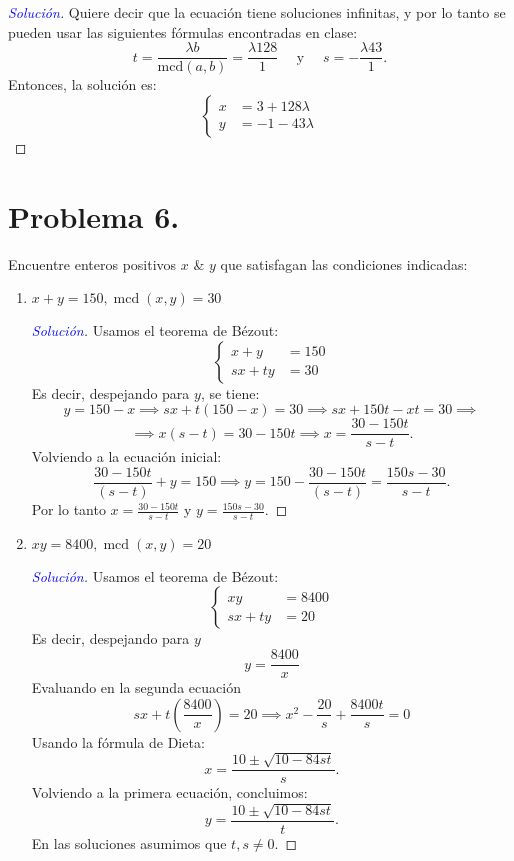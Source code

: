 \documentclass[a4paper,12pt]{article}
\newenvironment{solution}
  {\renewcommand\qedsymbol{$\square$}\begin{proof}[\textcolor{blue}{Solución}]}
  {\end{proof}}
\begin{document}
\begin{enumerate}[label=\alph*.]
\begin{solution}
		
		Quiere decir que la ecuación tiene soluciones infinitas, y por lo tanto se pueden usar las siguientes fórmulas encontradas en clase: 
		$$t=\frac{\lambda b}{\text{mcd}(a,b)}=\frac{\lambda 128}{1} \quad\text{ y }\quad s=-\frac{\lambda 43}{1}. $$
		Entonces, la solución es:
		$$\begin{cases}
			x &= 3+128\lambda\\
			y &= -1-43\lambda
		\end{cases}$$
	\end{solution}
\end{enumerate}

\section{Problema 6.} Encuentre enteros positivos $x $ \& $y$ que satisfagan las condiciones indicadas:
\begin{enumerate}[label=\alph*.]
	\item $x+y=150, \operatorname{mcd}(x, y)=30$
	\begin{solution}
		Usamos el teorema de Bézout:
		$$\begin{cases}
			x+y&=150\\
			sx+ty &=30
		\end{cases}$$
	Es decir, despejando para $y$, se tiene: 
	$$y=150-x\implies sx+t(150-x)=30\implies sx+150t-xt=30\implies$$
	$$\implies x(s-t)=30-150t\implies x= \frac{30-150t}{s-t}.$$
	Volviendo a la ecuación inicial:
	$$ \frac{30-150t}{(s-t)}+y=150\implies y=150-\frac{30-150t}{(s-t)}=\frac{150s-30}{s-t}.$$
	Por lo tanto $x=\frac{30-150t}{s-t}$ y $y=\frac{150s-30}{s-t}$.
	\end{solution}
	\item $x y=8400, \operatorname{mcd}(x, y)=20$
	\begin{solution}
		Usamos el teorema de Bézout:
		$$\begin{cases}
			xy&=8400\\
			sx+ty &=20
		\end{cases}$$
	Es decir, despejando para $y$
	$$y=\frac{8400}{x}$$
	Evaluando en la segunda ecuación 
	$$sx+t\left(\frac{8400}{x}\right)=20\implies x^2-\frac{20}{s}+\frac{8400t}{s}=0$$
	Usando la fórmula de Dieta: 
	$$x=\frac{10\pm \sqrt{10-84st}}{s}.$$
	Volviendo a la primera ecuación, concluimos: 
	$$y=\frac{10\pm \sqrt{10-84st}}{t}.$$
	En las soluciones asumimos que $t,s\neq 0$.
	\end{solution}
\end{enumerate}
\end{document}
